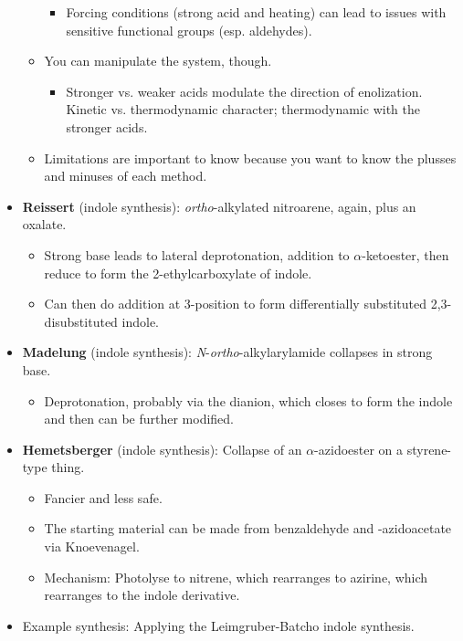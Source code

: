 \documentclass[../notes.tex]{subfiles}
\begin{document}
\begin{itemize}
\begin{itemize}
\begin{itemize}
            \item Forcing conditions (strong acid and heating) can lead to issues with sensitive functional groups (esp. aldehydes).
        \end{itemize}
        \item You can manipulate the system, though.
        \begin{itemize}
            \item Stronger vs. weaker acids modulate the direction of enolization. Kinetic vs. thermodynamic character; thermodynamic with the stronger acids.
        \end{itemize}
        \item Limitations are important to know because you want to know the plusses and minuses of each method.
    \end{itemize}
    \item \textbf{Reissert} (indole synthesis): \emph{ortho}-alkylated nitroarene, again, plus an oxalate.
    \begin{itemize}
        \item Strong base leads to lateral deprotonation, addition to $\alpha$-ketoester, then reduce to form the 2-ethylcarboxylate of indole.
        \item Can then do addition at 3-position to form differentially substituted 2,3-disubstituted indole.
    \end{itemize}
    \item \textbf{Madelung} (indole synthesis): \emph{N}-\emph{ortho}-alkylarylamide collapses in strong base.
    \begin{itemize}
        \item Deprotonation, probably via the dianion, which closes to form the indole and then can be further modified.
    \end{itemize}
    \item \textbf{Hemetsberger} (indole synthesis): Collapse of an $\alpha$-azidoester on a styrene-type thing.
    \begin{itemize}
        \item Fancier and less safe.
        \item The starting material can be made from benzaldehyde and -azidoacetate via Knoevenagel.
        \item Mechanism: Photolyse to nitrene, which rearranges to azirine, which rearranges to the indole derivative.
    \end{itemize}
    \item Example synthesis: Applying the Leimgruber-Batcho indole synthesis.

\end{itemize}
\end{document}
